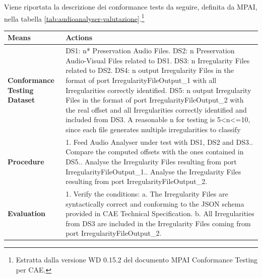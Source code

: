 Viene riportata la descrizione dei conformance tests da seguire, definita da MPAI, nella tabella \ref{tab:audioanalyser-valutazione}.\footnote{Estratta dalla versione WD 0.15.2 del documento MPAI Conformance Testing per \ac{CAE}.}

\begin{table}[h]
    \centering
    \begin{tabular}{|p{}|p{}|}
        \hline
        \textbf{Means}   &   \textbf{Actions}\\
        \hline
        \textbf{Conformance Testing Dataset}    &
            DS1: n* Preservation Audio Files.\newline
            DS2: n Preservation Audio-Visual Files related to DS1.\newline
            DS3: n Irregularity Files related to DS2.\newline
            DS4: n output Irregularity Files in the format of port IrregularityFileOutput\_1 with all Irregularities correctly identified.\newline
            DS5: n output Irregularity Files in the format of port IrregularityFileOutput\_2 with the real offset and all Irregularities correctly identified and included from DS3.\newline
            \newline
            \footnotesize* A reasonable n for testing is 5<n<=10, since each file generates multiple irregularities to classify\\
        \hline
        \textbf{Procedure}  &
            1.	Feed Audio Analyser under test with DS1, DS2 and DS3.\newline
            2.	Compare the computed offsets with the ones contained in DS5.\newline
            3.	Analyse the Irregularity Files resulting from port IrregularityFileOutput\_1.\newline
            4.	Analyse the Irregularity Files resulting from port IrregularityFileOutput\_2.\\
        \hline
        \textbf{Evaluation} &
            	1.	Verify the conditions:\newline
            	   a.	The Irregularity Files are syntactically correct and conforming to the JSON schema provided in CAE Technical Specification.\newline
            	   b.	All Irregularities from DS3 are included in the Irregularity Files coming from port IrregularityFileOutput\_2.\newline

\end{tabular}
\end{table}
